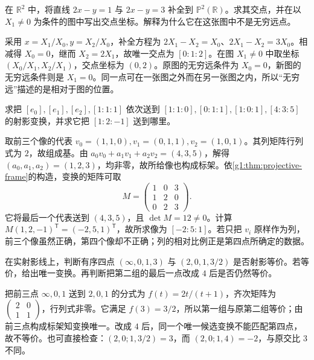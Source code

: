 \begin{exercise}\label{g1:ex:projective-completion}
	在 \(\mathbb R^2\) 中，将直线 \(2x-y=1\) 与 \(2x-y=3\) 补全到 \(\mathbb P^2(\mathbb R)\)。求其交点，并在以 \(X_1\ne0\) 为条件的图中写出交点坐标。解释为什么它在这张图中不是无穷远点。
\end{exercise}
\begin{solution}
	采用 \(x=X_1/X_0,y=X_2/X_0\)，补全方程为 \(2X_1-X_2=X_0\)、\(2X_1-X_2=3X_0\)。相减得 \(X_0=0\)，继而 \(X_2=2X_1\)，故唯一交点为 \([0:1:2]\)。在图 \(X_1\ne0\) 中取坐标 \((X_0/X_1,X_2/X_1)\)，交点坐标为 \((0,2)\)。原图的无穷远条件为 \(X_0=0\)，新图的无穷远条件则是 \(X_1=0\)。同一点可在一张图之外而在另一张图之内，所以“无穷远”描述的是相对于图的位置。
\end{solution}

\begin{exercise}\label{g1:ex:projective-frame}
	求把 \([e_0],[e_1],[e_2],[1:1:1]\) 依次送到 \([1:1:0],[0:1:1],[1:0:1],[4:3:5]\) 的射影变换，并求它把 \([1:2:-1]\) 送到哪里。
\end{exercise}
\begin{solution}
	取前三个像的代表 \(v_0=(1,1,0),v_1=(0,1,1),v_2=(1,0,1)\)。其列矩阵行列式为 \(2\)，故组成基。由 \(a_0v_0+a_1v_1+a_2v_2=(4,3,5)\)，解得 \((a_0,a_1,a_2)=(1,2,3)\)，均非零，故所给像也构成标架。依\cref{g1:thm:projective-frame}的构造，变换的矩阵可取
	\[
		M=\begin{pmatrix}1&0&3\\1&2&0\\0&2&3\end{pmatrix}.
	\]
	它将最后一个代表送到 \((4,3,5)\)，且 \(\det M=12\ne0\)。计算 \(M(1,2,-1)^{\mathsf T}=(-2,5,1)^{\mathsf T}\)，故所求像为 \([-2:5:1]\)。若只把 \(v_i\) 原样作为列，前三个像虽然正确，第四个像却不正确；列的相对比例正是第四点所确定的数据。
\end{solution}

\begin{exercise}\label{g1:ex:cross-ratio-test}
	在实射影线上，判断有序四点 \((\infty,0,1,3)\) 与 \((2,0,1,3/2)\) 是否射影等价。若等价，给出唯一变换。再判断把第二组的最后一点改成 \(4\) 后是否仍然等价。
\end{exercise}
\begin{solution}
	把前三点 \(\infty,0,1\) 送到 \(2,0,1\) 的分式为 \(f(t)=2t/(t+1)\)，齐次矩阵为 \(\begin{pmatrix}2&0\\1&1\end{pmatrix}\)，行列式非零。它满足 \(f(3)=3/2\)，所以第一组与原第二组等价；由前三点构成标架知变换唯一。改成 \(4\) 后，同一个唯一候选变换不能匹配第四点，故不等价。也可直接检查：\((2,0;1,3/2)=3\)，而 \((2,0;1,4)=-2\)，与原交比 \(3\) 不同。
\end{solution}

